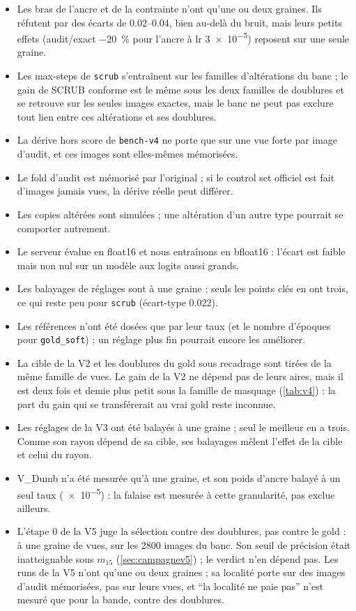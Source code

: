 \documentclass[11pt,a4paper]{article}
\newcommand{\code}[1]{\texttt{#1}}
\begin{document}
\begin{itemize}[leftmargin=1.2em]
    aux réglages proposés et non mesurés ; son étape 0 a tourné hors du registre, sa provenance est dans
    son dossier de run.
  \item Les bras de l'ancre et de la contrainte n'ont qu'une ou deux graines. Ils réfutent par des
    écarts de \numrange{0.02}{0.04}, bien au-delà du bruit, mais leurs petits effets (audit/exact
    \SI{-20}{\percent} pour l'ancre à lr \num{3e-5}) reposent sur une seule graine.
  \item Les max-steps de \code{scrub} s'entraînent sur les familles d'altérations du banc ; le gain de
    SCRUB conforme est le même sous les deux familles de doublures et se retrouve sur les seules images
    exactes, mais le banc ne peut pas exclure tout lien entre ces altérations et ses doublures.
  \item La dérive hors score de \code{bench-v4} ne porte que sur une vue forte par image d'audit, et
    ces images sont elles-mêmes mémorisées.
  \item Le fold d'audit est mémorisé par l'original ; si le control set officiel est fait d'images
    jamais vues, la dérive réelle peut différer.
  \item Les copies altérées sont simulées ; une altération d'un autre type pourrait se comporter
    autrement.
  \item Le serveur évalue en float16 et nous entraînons en bfloat16 : l'écart est faible mais non
    nul sur un modèle aux logits aussi grands.
  \item Les balayages de réglages sont à une graine ; seuls les points clés en ont trois, ce qui
    reste peu pour \code{scrub} (écart-type \num{0.022}).
  \item Les références n'ont été dosées que par leur taux (et le nombre d'époques pour
    \code{gold\_soft}) ; un réglage plus fin pourrait encore les améliorer.
  \item La cible de la V2 et les doublures du gold sous recadrage sont tirées de la même famille de
    vues. Le gain de la V2 ne dépend pas de leurs aires, mais il est deux fois et demie plus petit
    sous la famille de masquage (\cref{tab:v4}) : la part du gain qui se transférerait au vrai gold
    reste inconnue.
  \item Les réglages de la V3 ont été balayés à une graine ; seul le meilleur en a trois. Comme son
    rayon dépend de sa cible, ses balayages mêlent l'effet de la cible et celui du rayon.
  \item V\_Dumb n'a été mesurée qu'à une graine, et son poids d'ancre balayé à un seul taux
    (\num{e-5}) : la falaise est mesurée à cette granularité, pas exclue ailleurs.
  \item L'étape 0 de la V5 juge la sélection contre des doublures, pas contre le gold : à une graine de
    vues, sur les 2800 images du banc. Son seuil de précision était inatteignable sous $m_{15}$
    (\cref{sec:campagnev5}) ; le verdict n'en dépend pas. Les runs de la V5 n'ont qu'une ou deux
    graines ; sa localité porte sur des images d'audit mémorisées, pas sur leurs vues, et
    \enquote{la localité ne paie pas} n'est mesuré que pour la bande, contre des doublures.
\end{itemize}
\end{document}

